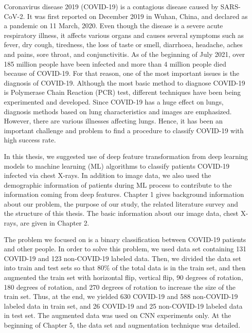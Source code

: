 Coronavirus disease 2019 (COVID-19) is a contagious disease caused by SARS-CoV-2. It was first reported on December 2019 in Wuhan, China, and declared as a pandemic on 11 March, 2020. Even though the disease is a severe acute respiratory illness, it affects various organs and causes several symptoms such as fever, dry cough, tiredness, the loss of taste or smell, diarrhoea, headache, aches and pains, sore throat, and conjunctivitis. As of the beginning of July 2021, over 185 million people have been infected and more than 4 million people died because of COVID-19. For that reason, one of the most important issues is the diagnosis of COVID-19. Although the most basic method to diagnose COVID-19 is Polymerase Chain Reaction (PCR) test, different techniques have been being experimented and developed. Since COVID-19 has a huge effect on lungs, diagnosis methods based on lung characteristics and images are emphasized. However, there are various illnesses affecting lungs. Hence, it has been an important challenge and problem to find a procedure to classify COVID-19 with high success rate.

In this thesis, we suggested use of deep feature transformation from deep learning models to machine learning (ML) algorithms to classify patients COVID-19 infected via chest X-rays. In addition to image data, we also used the demographic information of patients during ML process to contribute to the information coming from deep features. Chapter 1 gives background information about our problem, the purpose of our study, the related literature survey and the structure of this thesis. The basic information about our image data, chest X-rays, are given in Chapter 2.

The problem we focused on is a binary classification between COVID-19 patients and other people. In order to solve this problem, we used data set containing 131 COVID-19 and 123 non-COVID-19 labeled data. Then, we divided the data set into train and test sets so that 80\% of the total data is in the train set, and then augmented the train set with horizontal flip, vertical flip, 90 degrees of rotation, 180 degrees of rotation, and 270 degrees of rotation to increase the size of the train set. Thus, at the end, we yielded 630 COVID-19 and 588 non-COVID-19 labeled data in train set, and 26 COVID-19 and 25 non-COVID-19 labeled data in test set. The augmented data was used on CNN experiments only. At the beginning of Chapter 5, the data set and augmentation technique was detailed.

